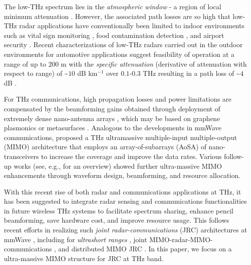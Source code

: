 \documentclass[journal,10pt]{IEEEtran}
\begin{document}
	The low-THz spectrum lies in the \textit{atmospheric window} - a region of local minimum  attenuation \cite{sun2016predicting,piesiewicz2007scattering}. However, the associated path losses are so high that low-THz radar applications have conventionally been limited to indoor environments such as vital sign monitoring \cite{xu2014vital}, food contamination detection \cite{ok2014high}, and airport security \cite{appleby2007standoff}. Recent characterizations of low-THz radars carried out in the outdoor environments for automotive applications \cite{norouzian2019rain,norouzian2019experimental} suggest feasibility of operation at a range of up to $200$ m with the \textit{specific attenuation} (derivative of attenuation with respect to range) of \textasciitilde$10$ dB km$^{-1}$ over $0.1$-$0.3$ THz resulting in a path loss of \textasciitilde$4$ dB \cite{appleby2007millimeter}.
	
	For THz communications, high propagation losses and power limitations are compensated by the beamforming gains obtained through deployment of extremely dense nano-antenna arrays \cite{ummimoTareqOverview}, which may be based on graphene plasmonics \cite{ju2011graphene,xu2014design} or metasurfaces \cite{moccia2018suboptimal}. Analogous to the developments in mmWave communications, \cite{ummimoTareq} proposed a THz ultramassive multiple-input multiple-output (MIMO) architecture that employs an array-of-subarrays (AoSA) of nano-transceivers to increase the coverage and improve the data rates. Various follow-up works (see, e.g., \cite{ummimoTareqOverview} for an overview) showed further ultra-massive MIMO enhancements through waveform design, beamforming, and resource allocation.
	
	With this recent rise of both radar and communications applications at THz, it has been suggested \cite{chaccour2021seven} to integrate radar sensing and  communications functionalities in future wireless THz systems to facilitate spectrum sharing, enhance pencil beamforming, save hardware cost, and improve resource usage. This follows recent efforts in realizing such \textit{joint radar-communications} (JRC) architectures at mmWave \cite{mishra2019toward}, including for \textit{ultrashort ranges} \cite{duggal2020doppler}, joint MIMO-radar-MIMO-communications \cite{dokhanchi2020multi}, and distributed MIMO JRC \cite{liu2020codesigning}. In this paper, we focus on a ultra-massive MIMO structure for JRC at THz band. 
	
\end{document}
